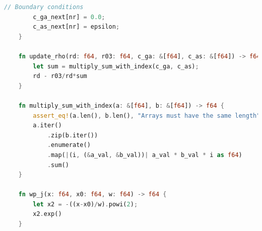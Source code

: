 \documentclass[14pt,oneside]{extarticle}
\begin{document}
\begin{lstlisting}[language=Rust]
        // Boundary conditions
        c_ga_next[nr] = 0.0;
        c_as_next[nr] = epsilon;
    }
    
    fn update_rho(rd: f64, r03: f64, c_ga: &[f64], c_as: &[f64]) -> f64 {
        let sum = multiply_sum_with_index(c_ga, c_as);
        rd - r03/rd*sum
    }
    
    fn multiply_sum_with_index(a: &[f64], b: &[f64]) -> f64 {
        assert_eq!(a.len(), b.len(), "Arrays must have the same length");
        a.iter()
            .zip(b.iter())
            .enumerate()
            .map(|(i, (&a_val, &b_val))| a_val * b_val * i as f64)
            .sum()
    }
    
    fn wp_j(x: f64, x0: f64, w: f64) -> f64 {
        let x2 = -((x-x0)/w).powi(2);
        x2.exp()
    } 
\end{lstlisting}
\end{document}
